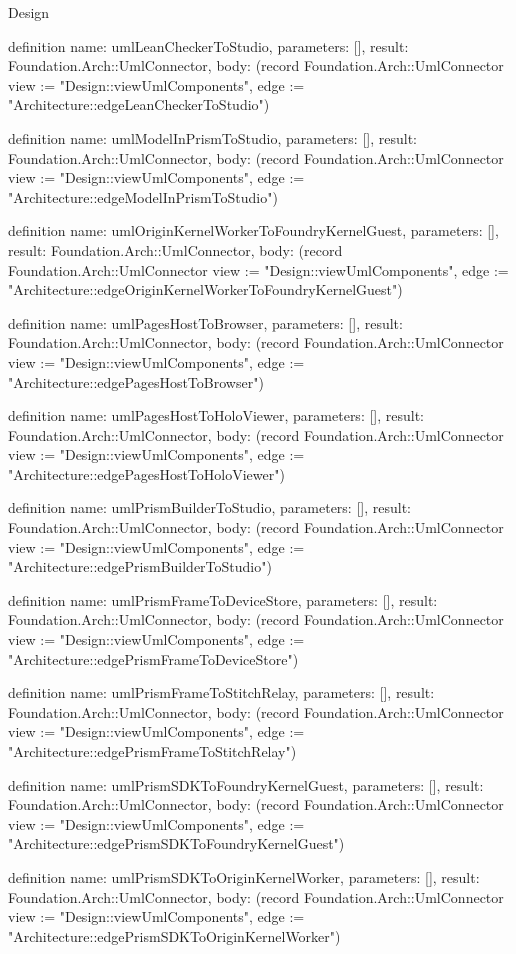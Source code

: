 \begin{lexlean}{Design}
\begin{semanticmodule}
definition{
  name: umlLeanCheckerToStudio,
  parameters: [],
  result: Foundation.Arch::UmlConnector,
  body: (record Foundation.Arch::UmlConnector {view := "Design::viewUmlComponents", edge := "Architecture::edgeLeanCheckerToStudio"})
}

definition{
  name: umlModelInPrismToStudio,
  parameters: [],
  result: Foundation.Arch::UmlConnector,
  body: (record Foundation.Arch::UmlConnector {view := "Design::viewUmlComponents", edge := "Architecture::edgeModelInPrismToStudio"})
}

definition{
  name: umlOriginKernelWorkerToFoundryKernelGuest,
  parameters: [],
  result: Foundation.Arch::UmlConnector,
  body: (record Foundation.Arch::UmlConnector {view := "Design::viewUmlComponents", edge := "Architecture::edgeOriginKernelWorkerToFoundryKernelGuest"})
}

definition{
  name: umlPagesHostToBrowser,
  parameters: [],
  result: Foundation.Arch::UmlConnector,
  body: (record Foundation.Arch::UmlConnector {view := "Design::viewUmlComponents", edge := "Architecture::edgePagesHostToBrowser"})
}

definition{
  name: umlPagesHostToHoloViewer,
  parameters: [],
  result: Foundation.Arch::UmlConnector,
  body: (record Foundation.Arch::UmlConnector {view := "Design::viewUmlComponents", edge := "Architecture::edgePagesHostToHoloViewer"})
}

definition{
  name: umlPrismBuilderToStudio,
  parameters: [],
  result: Foundation.Arch::UmlConnector,
  body: (record Foundation.Arch::UmlConnector {view := "Design::viewUmlComponents", edge := "Architecture::edgePrismBuilderToStudio"})
}

definition{
  name: umlPrismFrameToDeviceStore,
  parameters: [],
  result: Foundation.Arch::UmlConnector,
  body: (record Foundation.Arch::UmlConnector {view := "Design::viewUmlComponents", edge := "Architecture::edgePrismFrameToDeviceStore"})
}

definition{
  name: umlPrismFrameToStitchRelay,
  parameters: [],
  result: Foundation.Arch::UmlConnector,
  body: (record Foundation.Arch::UmlConnector {view := "Design::viewUmlComponents", edge := "Architecture::edgePrismFrameToStitchRelay"})
}

definition{
  name: umlPrismSDKToFoundryKernelGuest,
  parameters: [],
  result: Foundation.Arch::UmlConnector,
  body: (record Foundation.Arch::UmlConnector {view := "Design::viewUmlComponents", edge := "Architecture::edgePrismSDKToFoundryKernelGuest"})
}

definition{
  name: umlPrismSDKToOriginKernelWorker,
  parameters: [],
  result: Foundation.Arch::UmlConnector,
  body: (record Foundation.Arch::UmlConnector {view := "Design::viewUmlComponents", edge := "Architecture::edgePrismSDKToOriginKernelWorker"})
}


\end{semanticmodule}
\end{lexlean}
